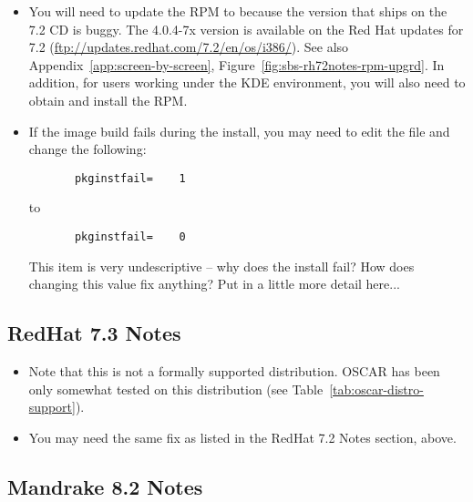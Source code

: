 \begin{itemize}
\item You will need to update the  RPM to
   because the version that ships on the 7.2 CD is
  buggy.  The 4.0.4-7x version is available on the Red Hat updates for
  7.2 (\url{ftp://updates.redhat.com/7.2/en/os/i386/}).  See also
  Appendix~\ref{app:screen-by-screen},
  Figure~\ref{fig:sbs-rh72notes-rpm-upgrd}. In addition, for users
  working under the KDE environment, you will also need to obtain and
  install the  RPM.
  
\item If the image build fails during the install, you may need to
  edit the file 
  and change the following:

\begin{verbatim}
       pkginstfail=    1
\end{verbatim}
  to
\begin{verbatim}
       pkginstfail=    0
\end{verbatim}

  \begin{discuss}
    This item is very undescriptive -- why does the install fail?  How
    does changing this value fix anything?  Put in a little more
    detail here...
  \end{discuss}
\end{itemize}


\subsection{RedHat 7.3 Notes}
\label{subsec:rh73notes}

\begin{itemize}
\item Note that this is not a formally supported distribution.  OSCAR
  \oscarversion\- has been only somewhat tested on this distribution
  (see Table~\ref{tab:oscar-distro-support}).

\item You may need the same  fix as listed
  in the RedHat 7.2 Notes section, above.
\end{itemize}


\subsection{Mandrake 8.2 Notes}
\label{subsec:mdk82notes}

